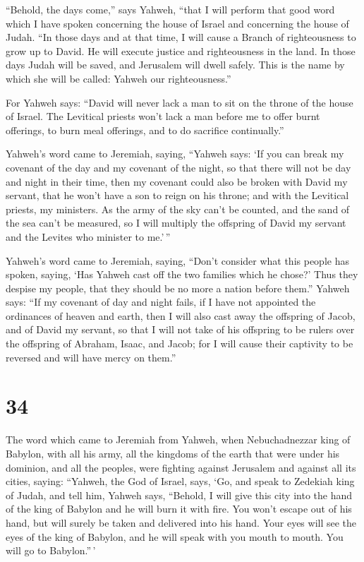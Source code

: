  ``Behold, the days come,'' says Yahweh, ``that I will
perform that good word which I have spoken concerning the house of
Israel and concerning the house of Judah.  ``In those days
and at that time, I will cause a Branch of righteousness to grow up to
David. He will execute justice and righteousness in the land.
 In those days Judah will be saved, and Jerusalem will
dwell safely. This is the name by which she will be called: Yahweh our
righteousness.''

 For Yahweh says: ``David will never lack a man to sit on
the throne of the house of Israel.  The Levitical priests
won't lack a man before me to offer burnt offerings, to burn meal
offerings, and to do sacrifice continually.''

 Yahweh's word came to Jeremiah, saying, 
``Yahweh says: `If you can break my covenant of the day and my covenant
of the night, so that there will not be day and night in their time,
 then my covenant could also be broken with David my
servant, that he won't have a son to reign on his throne; and with the
Levitical priests, my ministers.  As the army of the sky
can't be counted, and the sand of the sea can't be measured, so I will
multiply the offspring of David my servant and the Levites who minister
to me.'\,''

 Yahweh's word came to Jeremiah, saying, 
``Don't consider what this people has spoken, saying, `Has Yahweh cast
off the two families which he chose?' Thus they despise my people, that
they should be no more a nation before them.''  Yahweh
says: ``If my covenant of day and night fails, if I have not appointed
the ordinances of heaven and earth,  then I will also cast
away the offspring of Jacob, and of David my servant, so that I will not
take of his offspring to be rulers over the offspring of Abraham, Isaac,
and Jacob; for I will cause their captivity to be reversed and will have
mercy on them.''

\hypertarget{section-33}{%
\section{34}\label{section-33}}

 The word which came to Jeremiah from Yahweh, when
Nebuchadnezzar king of Babylon, with all his army, all the kingdoms of
the earth that were under his dominion, and all the peoples, were
fighting against Jerusalem and against all its cities, saying:
 ``Yahweh, the God of Israel, says, `Go, and speak to
Zedekiah king of Judah, and tell him, Yahweh says, ``Behold, I will give
this city into the hand of the king of Babylon and he will burn it with
fire.  You won't escape out of his hand, but will surely be
taken and delivered into his hand. Your eyes will see the eyes of the
king of Babylon, and he will speak with you mouth to mouth. You will go
to Babylon.''\,'


